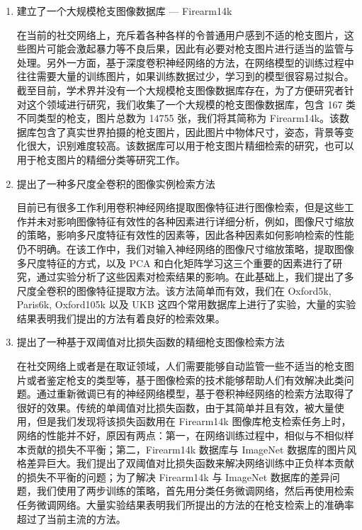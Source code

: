 \begin{enumerate}
\item 建立了一个大规模枪支图像数据库 --- Firearm14k

在当前的社交网络上，充斥着各种各样的令普通用户感到不适的枪支图片，这些图片可能会激起暴力等不良后果，因此有必要对枪支图片进行适当的监管与处理。另外一方面，基于深度卷积神经网络的方法，在网络模型的训练过程中往往需要大量的训练图片，如果训练数据过少，学习到的模型很容易过拟合。截至目前，学术界并没有一个大规模枪支图像数据库存在，为了方便研究者针对这个领域进行研究，我们收集了一个大规模的枪支图像数据库，包含 167 类不同类型的枪支，图片总数为 14755 张，我们将其简称为 Firearm14k。该数据库包含了真实世界拍摄的枪支图片，因此图片中物体尺寸，姿态，背景等变化很大，识别难度较高。该数据库可以用于枪支图片精细检索的研究，也可以用于枪支图片的精细分类等研究工作。

\item 提出了一种多尺度全卷积的图像实例检索方法

目前已有很多工作利用卷积神经网络提取图像特征进行图像检索，但是这些工作并未对影响图像特征有效性的各种因素进行详细分析，例如，图像尺寸缩放的策略，影响多尺度特征有效性的因素等，因此各种因素如何影响检索的性能仍不明确。在该工作中，我们对输入神经网络的图像尺寸缩放策略，提取图像多尺度特征的方式，以及 PCA 和白化矩阵学习这三个重要的因素进行了研究，通过实验分析了这些因素对检索结果的影响。在此基础上，我们提出了多尺度全卷积的图像特征提取方法。该方法简单而有效，我们在 Oxford5k, Paris6k, Oxford105k 以及 UKB 这四个常用数据库上进行了实验，大量的实验结果表明我们提出的方法有着良好的检索效果。

\item 提出了一种基于双阈值对比损失函数的精细枪支图像检索方法

在社交网络上或者是在取证领域，人们需要能够自动监管一些不适当的枪支图片或者鉴定枪支的类型等，基于图像检索的技术能够帮助人们有效解决此类问题。通过重新微调已有的神经网络模型，基于卷积神经网络的检索方法取得了很好的效果。传统的单阈值对比损失函数，由于其简单并且有效，被大量使用，但是我们发现将该损失函数用在 Firearm14k 图像库枪支检索任务上时，网络的性能并不好，原因有两点：第一，在网络训练过程中，相似与不相似样本贡献的损失不平衡；第二，Firearm14k 数据库与 ImageNet 数据库的图片风格差异巨大。我们提出了双阈值对比损失函数来解决网络训练中正负样本贡献的损失不平衡的问题；为了解决 Firearm14k 与 ImageNet 数据库的差异问题，我们使用了两步训练的策略，首先用分类任务微调网络，然后再使用检索任务微调网络。大量实验结果表明我们所提出的方法的在枪支检索上的准确率超过了当前主流的方法。

\end{enumerate}


